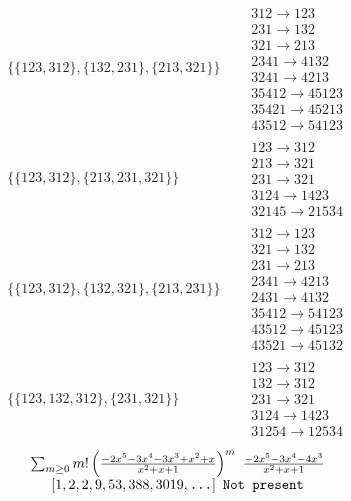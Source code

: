 \begin{tiny}
\begin{align}
\begin{matrix}
\end{matrix}
\\
\{\{123, 312\}, \{132, 231\}, \{213, 321\}\}
\quad
&
\begin{matrix}
312 \to 123\\231 \to 132\\321 \to 213\\2341 \to 4132\\3241 \to 4213\\35412 \to 45123\\35421 \to 45213\\43512 \to 54123
\end{matrix}
\\
\{\{123, 312\}, \{213, 231, 321\}\}
\quad
&
\begin{matrix}
123 \to 312\\213 \to 321\\231 \to 321\\3124 \to 1423\\32145 \to 21534
\end{matrix}
\\
\{\{123, 312\}, \{132, 321\}, \{213, 231\}\}
\quad
&
\begin{matrix}
312 \to 123\\321 \to 132\\231 \to 213\\2341 \to 4213\\2431 \to 4132\\35412 \to 54123\\43512 \to 45123\\43521 \to 45132
\end{matrix}
\\
\{\{123, 132, 312\}, \{231, 321\}\}
\quad
&
\begin{matrix}
123 \to 312\\132 \to 312\\231 \to 321\\3124 \to 1423\\31254 \to 12534
\end{matrix}
\end{align}
$$
\begin{matrix}
\sum_{m \geq 0} m! \left(
\frac{-2 x^{5} - 3 x^{4} - 3 x^{3} + x^{2} + x}{x^{2} + x + 1}
\right)^m
\ 
\frac{-2 x^{5} - 3 x^{4} - 4 x^{3}}{x^{2} + x + 1}
\\
\left[1, 2, 2, 9, 53, 388, 3019, \text{\texttt{...}}\right]
\ 
\texttt{Not present}
\end{matrix}
$$
\vspace{-1em}

\end{tiny}
